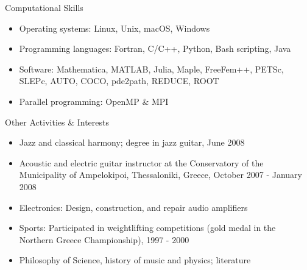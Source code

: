 \documentclass[10pt]{article} %
\newenvironment{outerlist}[1][\enskip\textbullet]%
        {\begin{itemize}[#1]}{\end{itemize}%
         \vspace{-.6\baselineskip}}
\begin{document}
\begin{section}{Computational Skills}%
\begin{outerlist}

\item \vskip -7mm
Operating systems: Linux, Unix, macOS, Windows
\item Programming languages: Fortran, C/C++, Python, Bash scripting, Java
\item Software: Mathematica, MATLAB, Julia, Maple, FreeFem{\small +$\!$+}, PETSc, SLEPc, AUTO, COCO, pde2path, REDUCE, ROOT
\item Parallel programming: OpenMP \& MPI

\end{outerlist}

\end{section}

\begin{section}{Other Activities \& Interests}
\begin{outerlist}

\item \vskip -7mm 
Jazz and classical harmony; degree in jazz guitar, June 2008
\item Acoustic and electric guitar instructor at the Conservatory 
of the Municipality of Ampelokipoi, Thessaloniki, Greece, October 2007 - January 2008
\item Electronics: Design, construction, and repair audio amplifiers
\item Sports: Participated in weightlifting competitions (gold medal in the
Northern Greece Championship), 1997 - 2000
\item Philosophy of Science, history of music and physics; literature
\end{outerlist}

\end{section}
\end{document}
